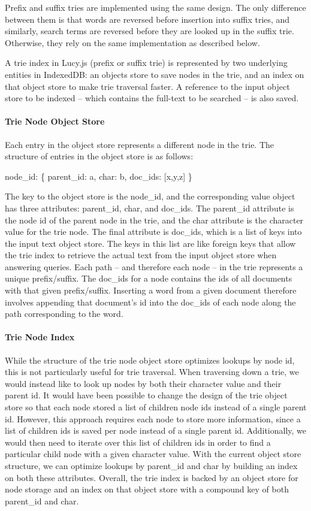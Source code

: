 \documentclass{vldb}
\begin{document}
Prefix and suffix tries are implemented using the same design. The only difference between them is that words are reversed before insertion into suffix tries, and similarly, search terms are reversed before they are looked up in the suffix trie. Otherwise, they rely on the same implementation as described below.

A trie index in Lucy.js (prefix or suffix trie) is represented by two underlying entities in IndexedDB: an objects store to save nodes in the trie, and an index on that object store to make trie traversal faster.  A reference to the input object store to be indexed -- which contains the full-text to be searched -- is also saved.

\paragraph{Trie Node Object Store}
Each entry in the object store represents a different node in the trie. The structure of entries in the object store is as follows:
\begin{center}
node\_id: \{ parent\_id: a, char: b, doc\_ids: [x,y,z] \}
\end{center}
The key to the object store is the node\_id, and the corresponding value object has three attributes: parent\_id, char, and doc\_ids. The parent\_id attribute is the node id of the parent node in the trie, and the char attribute is the character value for the trie node. The final attribute is doc\_ids, which is a list of keys into the input text object store. The keys in this list are like foreign keys that allow the trie index to retrieve the actual text from the input object store when answering queries. Each path -- and therefore each node -- in the trie represents a unique prefix/suffix. The doc\_ids for a node contains the ids of all documents with that given prefix/suffix. Inserting a word from a given document therefore involves appending that document's id into the doc\_ids of each node along the path corresponding to the word.

\paragraph{Trie Node Index}
While the structure of the trie node object store optimizes lookups by node id, this is not particularly useful for trie traversal. When traversing down a trie, we would instead like to look up nodes by both their character value and their parent id. It would have been possible to change the design of the trie object store so that each node stored a list of children node ids instead of a single parent id. However, this approach requires each node to store more information, since a list of children ids is saved per node instead of a single parent id. Additionally, we would then need to iterate over this list of children ids in order to find a particular child node with a given character value. With the current object store structure, we can optimize lookups by parent\_id and char by building an index on both these attributes. Overall, the trie index is backed by an object store for node storage and an index on that object store with a compound key of both parent\_id and char.
\end{document}
